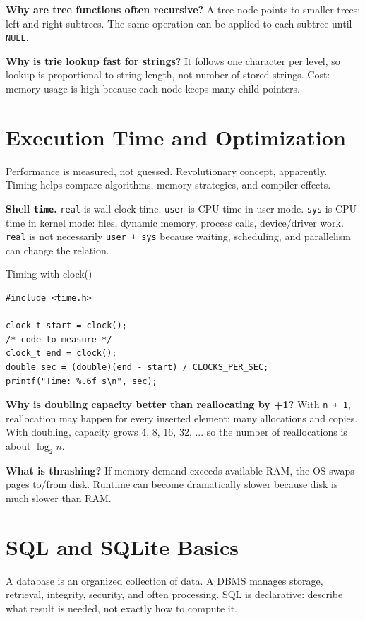 \documentclass[9pt,a4paper]{article}
\newcommand{\code}[1]{\texttt{#1}}
\begin{document}
\begin{exam}
\textbf{Why are tree functions often recursive?} A tree node points to smaller trees: left and right subtrees. The same operation can be applied to each subtree until \code{NULL}.\par
\textbf{Why is trie lookup fast for strings?} It follows one character per level, so lookup is proportional to string length, not number of stored strings. Cost: memory usage is high because each node keeps many child pointers.
\end{exam}

\section{Execution Time and Optimization}
\begin{idea}
Performance is measured, not guessed. Revolutionary concept, apparently. Timing helps compare algorithms, memory strategies, and compiler effects.
\end{idea}

\textbf{Shell \code{time}.} \code{real} is wall-clock time. \code{user} is CPU time in user mode. \code{sys} is CPU time in kernel mode: files, dynamic memory, process calls, device/driver work. \code{real} is not necessarily \code{user + sys} because waiting, scheduling, and parallelism can change the relation.

\begin{codebox}{Timing with clock()}
\begin{lstlisting}[style=cstyle]
#include <time.h>

clock_t start = clock();
/* code to measure */
clock_t end = clock();
double sec = (double)(end - start) / CLOCKS_PER_SEC;
printf("Time: %.6f s\n", sec);
\end{lstlisting}
\end{codebox}

\begin{exam}
\textbf{Why is doubling capacity better than reallocating by +1?} With \code{n + 1}, reallocation may happen for every inserted element: many allocations and copies. With doubling, capacity grows 4, 8, 16, 32, ... so the number of reallocations is about \(\log_2 n\).\par
\textbf{What is thrashing?} If memory demand exceeds available RAM, the OS swaps pages to/from disk. Runtime can become dramatically slower because disk is much slower than RAM.
\end{exam}

\section{SQL and SQLite Basics}
\begin{idea}
A database is an organized collection of data. A DBMS manages storage, retrieval, integrity, security, and often processing. SQL is declarative: describe what result is needed, not exactly how to compute it.
\end{idea}
\end{document}
